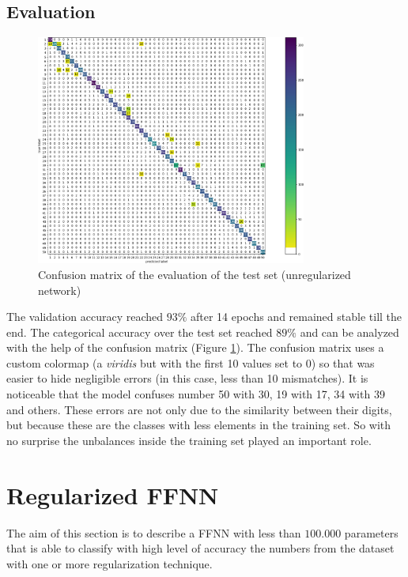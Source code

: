 \documentclass[compsoc]{IEEEtran}
\begin{document}
\subsection{Evaluation}
\begin{figure}[ht!]
\centering                                                                        
\includegraphics[width=3.5in]{noregcm.png}
\captionsetup{justification=centering}                                                                                                                                   
\caption{Confusion matrix of the evaluation of the test set (unregularized network)}
\label{fig:noregcm}                                                                                                                                                           
\end{figure}
The validation accuracy reached $93\%$ after 14 epochs and remained stable till the end. The categorical accuracy 
over the test set reached $89\%$ and can be analyzed with the help of the confusion matrix (Figure \ref{fig:noregcm}). 
The confusion matrix uses a custom colormap (a \emph{viridis} but with the first 10 values set to 0) so that was easier
to hide negligible errors (in this case, less than 10 mismatches). It is noticeable that the model confuses number 50 with 30,
19 with 17, 34 with 39 and others. These errors are not only due to the similarity between their digits, but because
these are the classes with less elements in the training set. So with no surprise the unbalances inside the training set played an
important role.

\par





\section{Regularized FFNN}
The aim of this section is to describe a FFNN with less than $100.000$ parameters that is able to classify
with high level of accuracy the numbers from the dataset with one or more regularization technique. 
\end{document}
